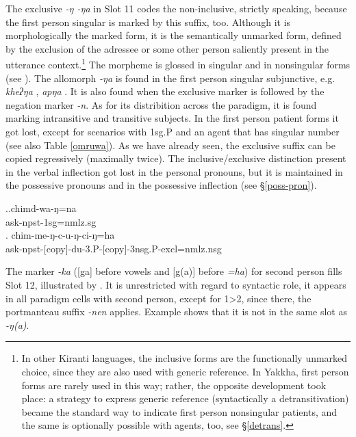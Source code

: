 	
The  exclusive \emph{-ŋ \ti -ŋa} in Slot 11 codes the non-inclusive,  strictly speaking, because the first person singular is marked by this suffix, too. Although it is morphologically the  marked form,  it is the semantically unmarked form, defined by the exclusion of the adressee or some other person saliently present in the utterance context.\footnote{In other Kiranti languages, the inclusive forms are the functionally unmarked choice, since they are also used with generic reference. In Yakkha, first person forms are rarely used in this way; rather, the opposite development took place: a strategy to express generic reference (syntactically a detransitivation) became the standard way to indicate first person nonsingular patients, and the same is optionally possible with agents, too, see §\ref{detrans}.} The morpheme is glossed  in singular and   in nonsingular forms (see \Next). The allomorph \emph{-ŋa} is found in the first person singular subjunctive, e.g. \emph{kheʔŋa} , \emph{apŋa} . It is also found when the exclusive marker is followed by the negation marker \emph{-n}. As for its distribition across the paradigm, it is found marking intransitive and transitive subjects. In the first person patient forms it got lost, except for scenarios with {\sc 1sg.P}  and an agent that has singular number (see also Table \ref{omruwa}). As we have already seen, the exclusive suffix can be copied regressively (maximally twice). The inclusive/exclusive distinction present in the verbal inflection got lost in the personal pronouns, but it is maintained in the possessive pronouns and in the possessive inflection (see §\ref{poss-pron}). 

	\ex.\ag.chimd-wa-ŋ=na\\
	ask{\sc -npst-1sg=nmlz.sg}\\
	\bg. chim-me-ŋ-c-u-ŋ-ci-ŋ=ha\\
	ask{\sc -npst-[copy]-du-3.P-[copy]-3nsg.P-excl=nmlz.nsg}\\
		
		
The marker \emph{-ka} ([ga] before vowels and [g(a)] before \emph{=ha}) for second person  fills Slot 12, illustrated by  \Next. It is unrestricted with regard to syntactic role, it appears in all paradigm cells with second person, except for 1>2, since there, the portmanteau suffix \emph{-nen} applies. Example \Next[b] shows that it is not in the same slot as \emph{-ŋ(a)}.


